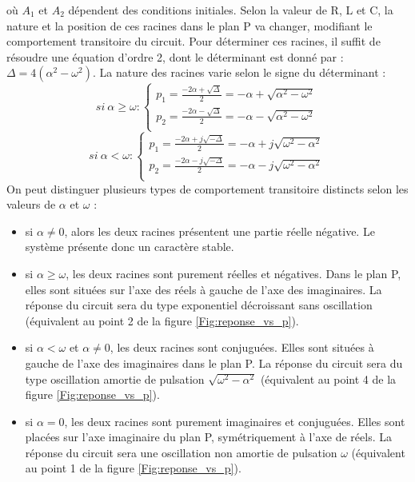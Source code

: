 	 où $A_{1}$ et $A_{2}$ dépendent des conditions initiales. Selon la valeur de R, L et C, la nature et la position de ces racines dans le plan P va changer, modifiant le comportement transitoire du circuit. Pour déterminer ces racines, il suffit de résoudre une équation d'ordre 2, dont le déterminant est donné par : $\Delta = 4(\alpha^{2}-\omega^{2})$. La nature des racines varie selon le signe du déterminant :
	\begin{equation}
	si~\alpha \geq \omega : \left \{
		\begin{array}{l}
			p_{1}=\frac{-2\alpha +\sqrt{\Delta}}{2}=-\alpha+\sqrt{\alpha^{2}-\omega^{2}} \\
			p_{2}=\frac{-2\alpha -\sqrt{\Delta}}{2}=-\alpha-\sqrt{\alpha^{2}-\omega^{2}} \\
		\end{array}
	\right.
	\end{equation}
	\begin{equation}
	si~\alpha < \omega : \left \{
	\begin{array}{l}
	p_{1}=\frac{-2\alpha +j\sqrt{-\Delta}}{2}=-\alpha+j\sqrt{\omega^{2}-\alpha^{2}} \\
	p_{2}=\frac{-2\alpha -j\sqrt{-\Delta}}{2}=-\alpha-j\sqrt{\omega^{2}-\alpha^{2}} \\
	\end{array}
	\right.
	\end{equation}
	On peut distinguer plusieurs types de comportement transitoire distincts selon les valeurs de $\alpha$ et $\omega$ :
	\begin{itemize}
		\item si $\alpha \neq 0$, alors les deux racines présentent une partie réelle négative. Le système présente donc un caractère stable.
		\item si $\alpha \geq \omega$, les deux racines sont purement réelles et négatives. Dans le plan P, elles sont situées sur l'axe des réels à gauche de l'axe des imaginaires. La réponse du circuit sera du type exponentiel décroissant sans oscillation (équivalent au point 2 de la figure \ref{Fig:reponse_vs_p}).
		\item si $\alpha < \omega$ et $\alpha \neq 0$, les deux racines sont conjuguées. Elles sont situées à gauche de l'axe des imaginaires dans le plan P. La réponse du circuit sera du type oscillation amortie de pulsation $\sqrt{\omega^{2}-\alpha^{2}}$ (équivalent au point 4 de la figure \ref{Fig:reponse_vs_p}). 
		\item si $\alpha = 0$, les deux racines sont purement imaginaires et conjuguées. Elles sont placées sur l'axe imaginaire du plan P, symétriquement à l'axe de réels. La réponse du circuit sera une oscillation non amortie de pulsation $\omega$ (équivalent au point 1 de la figure \ref{Fig:reponse_vs_p}). 
	\end{itemize}
	\vspace{1\baselineskip}

